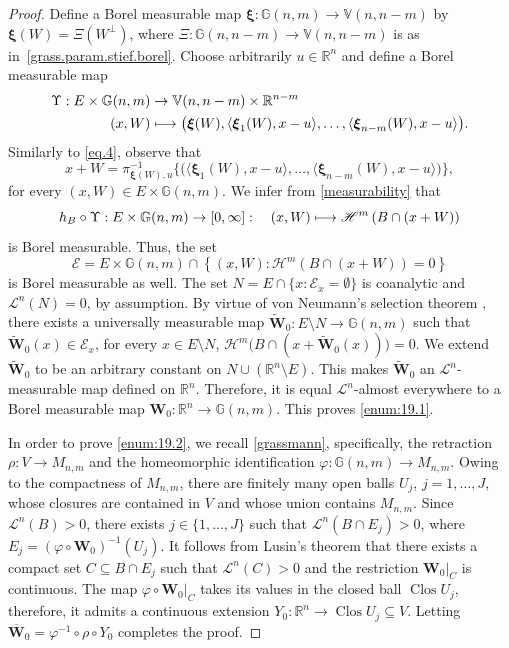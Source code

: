 \documentclass[JEP,XML,SOM,Unicode,ThmDefs,NoEqCountersInSection]{cedram}
\newcommand\mto{\mathchoice{\longmapsto}{\mapsto}{\mapsto}{\mapsto}}
\newcommand{\R}{\mathbb{R}}
\newcommand{\Rn}{\R^n}
\newcommand{\calE}{\mathscr{E}}
\newcommand{\calH}{\mathscr{H}}
\newcommand{\calL}{\mathscr{L}}
\newcommand{\bxi}{\boldsymbol{\xi}}
\newcommand{\bW}{{\boldsymbol{W}}}
\newcommand{\bV}{\mathbb{V}}
\newcommand{\bG}{\mathbb{G}}
\let\bY Y
\DeclareMathOperator{\rmClos}{\mathrm{Clos}}
\let\vphi\varphi
\let\la\langle
\let\ra\rangle
\let\subset\subseteq
\begin{document}
\begin{proof}
Define a Borel measurable map $\bxi: \bG(n,m) \to \bV(n,n-m)$ by $\bxi(W) = \Xi \left(W^\perp \right)$, where $\Xi: \bG(n,n-m) \to \bV(n,n-m)$ is as in~\ref{grass.param.stief.borel}.
Choose arbitrarily $u \in \Rn$ and define a Borel measurable map
\begin{align*}
\Upsilon: E \times \bG(n,m) &\to \bV(n,n-m) \times \R^{n-m} \\
(x,W) &\mto \bigl(\bxi(W), \la \bxi_1(W),x-u \ra, \ldots, \la \bxi_{n-m}(W),x-u \ra \bigr).
\end{align*}
Similarly to \eqref{eq.4}, observe that
\begin{equation*}
x+W = \pi_{\bxi(W),u}^{-1} \bigl\{ \bigl(\la \bxi_1(W),x-u \ra, \ldots, \la \bxi_{n-m}(W),x-u \ra \bigr) \bigr\},
\end{equation*}
for every $(x,W) \in E \times \bG(n,m)$.
We infer from \ref{measurability} that
\begin{equation*}
h_{B} \circ \Upsilon:E \times \bG(n,m) \to [0,\infty]:\quad(x,W) \mto \calH^m \left(B \cap (x+W) \right)
\end{equation*}
is Borel measurable.
Thus, the set
\begin{equation*}
\calE = E \times \bG(n,m) \cap \left\{ (x,W): \calH^m \left(B \cap (x+W) \right) = 0 \right\}
\end{equation*}
is Borel measurable as well.
The set $N = E \cap \{ x: \calE_x = \emptyset \}$ is coanalytic and $\calL^n(N)=0$, by assumption.
By virtue of von Neumann's selection theorem \cite[5.5.3]{SRIVASTAVA}, there exists a universally measurable map $\tilde{\bW}_0: E \setminus N \to \bG(n,m)$ such that $\tilde{\bW}_0(x) \in \calE_x$, for every $x \in E \setminus N$, \ie $\calH^m \bigl(B \cap(x + \tilde{\bW}_0(x))\bigl) = 0$.
We extend $\tilde{\bW}_0$ to be an arbitrary constant on $N \cup (\Rn \setminus E)$.
This makes $\tilde{\bW}_0$ an $\calL^n$-measurable map defined on $\Rn$.
Therefore, it is equal $\calL^n$-almost everywhere to a Borel measurable map $\bW_0: \Rn \to \bG(n,m)$.
This proves \eqref{enum:19.1}.
\par
In order to prove \eqref{enum:19.2}, we recall \ref{grassmann}, specifically, the retraction $\rho: V \to M_{n,m}$ and the homeomorphic identification $\vphi: \bG(n,m) \to M_{n,m}$.
Owing to the compactness of $M_{n,m}$, there are finitely many open balls $U_j$, $j=1,\ldots,J$, whose closures are contained in $V$ and whose union contains $M_{n,m}$.
Since $\calL^n(B) > 0$, there exists $j \in \{1,\ldots,J\}$ such that $\calL^n \left(B \cap E_j \right) > 0$, where $E_j = \left(\vphi \circ \bW_0 \right)^{-1}(U_j)$.
It follows from Lusin's theorem \cite[2.5.3]{GMT} that there exists a compact set $C \subset B \cap E_j$ such that $\calL^n(C) > 0$ and the restriction $\bW_0|_C$ is continuous.
The map $\vphi \circ \bW_0|_C$ takes its values in the closed ball $\rmClos U_j$, therefore, it admits a continuous extension $\bY_0: \Rn \to \rmClos U_j \subset V$.
Letting $\overline{\bW}_0 = \vphi^{-1} \circ \rho \circ \bY_0$ completes the proof.
\end{proof}
\end{document}

